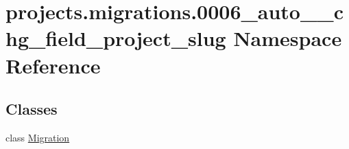 \hypertarget{namespaceprojects_1_1migrations_1_10006__auto____chg__field__project__slug}{\section{projects.\-migrations.0006\-\_\-auto\-\_\-\-\_\-chg\-\_\-field\-\_\-project\-\_\-slug Namespace Reference}
\label{namespaceprojects_1_1migrations_1_10006__auto____chg__field__project__slug}
}
\subsection*{Classes}
\begin{DoxyCompactItemize}
\item 
class \hyperlink{classprojects_1_1migrations_1_10006__auto____chg__field__project__slug_1_1_migration}{Migration}
\end{DoxyCompactItemize}
